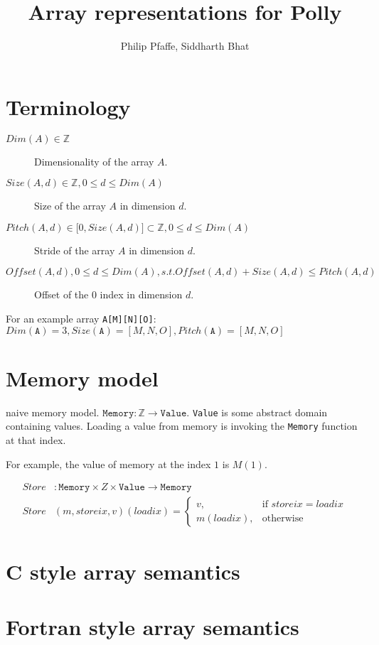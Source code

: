 \documentclass{article}
\title{Array representations for Polly}
\author{Philip Pfaffe, Siddharth Bhat}
\begin{document}
\maketitle

\newpage
\tableofcontents
\newpage

\section{Terminology}
\begin{description}
\item[$Dim(A) \in \mathbb{Z}$] Dimensionality of the array $A$.
\item[$Size(A, d) \in \mathbb{Z}, 0 \leq d \leq Dim(A)$] Size of the array $A$ in dimension $d$.
\item[$Pitch(A, d)  \in \lbrack 0,Size(A, d) \rbrack \subset \mathbb{Z}, 0\leq d \leq Dim(A) $] Stride of the array $A$ in dimension $d$.  
\item[$Offset(A, d), 0\leq d \leq Dim(A), s.t. Offset(A, d) + Size(A, d) \leq Pitch(A, d)$] Offset of the 0 index in dimension $d$.
\end{description}

For an example array \texttt{A[M][N][O]}: $Dim(\mathtt{A}) = 3, Size(\mathtt{A}) = [M,N,O], Pitch(\mathtt{A}) = [M,N,O]$

\section{Memory model}
naive memory model. $\texttt{Memory}: \mathbb{Z} \rightarrow \texttt{Value}$. \texttt{Value} is some abstract domain containing values. Loading a value from memory is invoking the \texttt{Memory} function at that index.


For example, the value of memory at the index $1$ is $M(1)$.


\begin{align*}
Store &: \texttt{Memory} \times Z \times \texttt{Value} \rightarrow \texttt{Memory} \\
Store &(m, storeix, v)  (loadix) = 
    \begin{cases}
        v, &\text{if } storeix = loadix \\
        m(loadix), &\text{otherwise}
    \end{cases}
\end{align*}

\section{C style array semantics}

\section{Fortran style array semantics}
\end{document}
